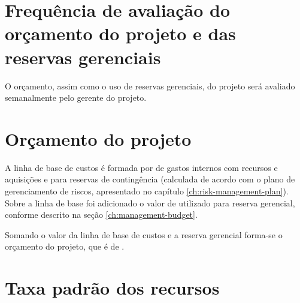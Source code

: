 \section{Frequência de avaliação do orçamento do projeto e das reservas gerenciais}

O orçamento, assim como o uso de reservas gerenciais, do projeto será avaliado semanalmente pelo gerente do projeto.

\section{Orçamento do projeto}

 A linha de base de custos é formada por \resourcesBudget{} de gastos internos com recursos e aquisições e \contingencyBudget{} para reservas de contingência (calculada de acordo com o plano de gerenciamento de riscos, apresentado no capítulo \ref{ch:risk-management-plan}). Sobre a linha de base foi adicionado o valor de \managementBudget{} utilizado para reserva gerencial, conforme descrito na seção \ref{ch:management-budget}.

 Somando o valor da linha de base de custos e a reserva gerencial forma-se o orçamento do projeto, que é de \realBudget{}.

\section{Taxa padrão dos recursos}

